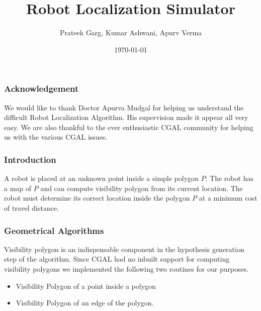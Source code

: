 \documentclass{beamer}
\title{Robot Localization Simulator}
\author{ Prateek Garg, Kumar Ashwani, Apurv Verma }
\date {\today}
\begin{document}
\frame{\titlepage}

\frame
{
  \frametitle{Acknowledgement}
We would like to thank Doctor Apurva Mudgal for helping us understand the difficult Robot Localization Algorithm.
 His supervision made it appear all very easy.
 We are also thankful to the ever enthusiastic CGAL community for helping us with the various CGAL issues.


}

\frame
{
  \frametitle{Introduction}

A robot is placed at an unknown point inside a simple polygon $ P $. The robot has a map of 
$ P$ and can compute visibility polygon from its current location. The robot must determine its correct 
location inside the polygon $P $ at a minimum cost of travel distance.

}



\frame
{
  \frametitle{Geometrical Algorithms}

Visibility polygon is an indispensable component in the hypothesis generation step of the algorithm. Since CGAL had no inbuilt support
 for computing visibility polygons we implemented the following two routines for our purposes.
\begin{itemize}
 \item Visibility Polygon of a point inside a polygon
 \item Visibility Polygon of an edge of the polygon.
\end{itemize}

}
\end{document}
